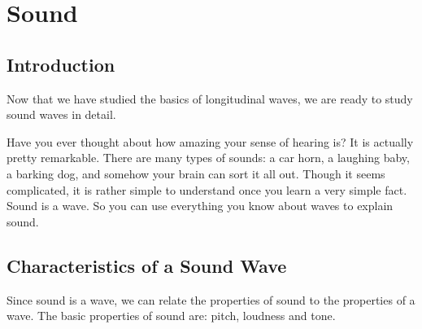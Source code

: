 \chapter{Sound}
\label{p:wsl:s11}


\section{Introduction}
Now that we have studied the basics of longitudinal waves, we are ready to study sound waves in detail.

Have you ever thought about how amazing your sense of hearing is? It is actually pretty remarkable. There are many types of sounds: a car horn, a laughing baby, a barking dog, and somehow your brain can sort it all out. Though it seems complicated, it is rather simple to understand once you learn a very simple fact. Sound is a wave. So you can use everything you know about waves to explain sound.\\
\section{Characteristics of a Sound Wave}

Since sound is a wave, we can relate the properties of sound to the properties of a wave. The basic properties of sound are: pitch, loudness and tone.

